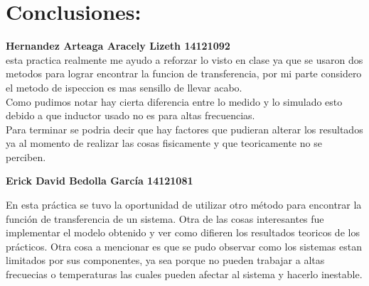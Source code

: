 \documentclass[12pt,letterpaper]{IEEEtran}
\begin{document}
	
	\section{\textbf{Conclusiones:}}
	\textbf{Hernandez Arteaga Aracely Lizeth 14121092}\\
	esta practica realmente me ayudo a reforzar lo visto en clase ya que se usaron dos metodos para lograr encontrar la funcion de transferencia, por mi parte considero el metodo de ispeccion es mas sensillo de llevar acabo.\\
	Como pudimos notar hay cierta diferencia entre lo medido y lo simulado esto debido a que inductor usado no es para altas frecuencias.\\
	Para terminar se podria decir que hay factores que pudieran alterar los resultados ya al momento de realizar las cosas fisicamente y que teoricamente no se perciben.  
	
	\textbf{Erick David Bedolla García 14121081}
	
	En esta práctica se tuvo la oportunidad de utilizar otro método para encontrar la función de transferencia de un sistema. Otra de las cosas interesantes fue implementar el modelo obtenido y ver como difieren los resultados teoricos de los prácticos. Otra cosa a mencionar es que se pudo observar como los sistemas estan limitados por sus componentes, ya sea porque no pueden trabajar a altas frecuecias o temperaturas las cuales pueden afectar al sistema y hacerlo inestable.
\end{document}
